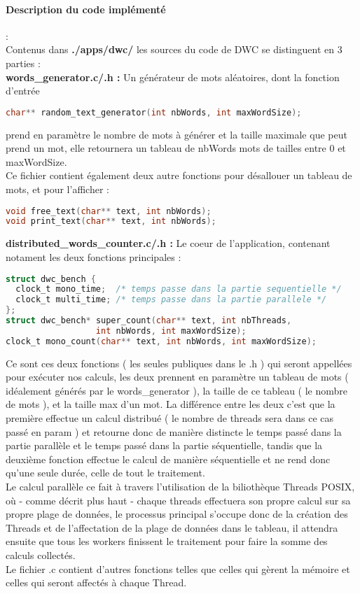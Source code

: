 \paragraph{Description du code implémenté}:\\

Contenus dans \textbf{./apps/dwc/} les sources du code de DWC se distinguent en 3 parties :\\

\textbf{words\_generator.c/.h :} Un générateur de mots aléatoires, dont la fonction d'entrée 
\begin{lstlisting}[language=C]
char** random_text_generator(int nbWords, int maxWordSize);
\end{lstlisting}
prend en paramètre le nombre de mots à générer et la taille maximale que peut prend un mot, elle retournera un tableau de nbWords mots de tailles entre 0 et maxWordSize.\\
Ce fichier contient également deux autre fonctions pour désallouer un tableau de mots, et pour l'afficher :
\begin{lstlisting}[language=C]
void free_text(char** text, int nbWords);
void print_text(char** text, int nbWords);
\end{lstlisting}

\textbf{distributed\_words\_counter.c/.h :} Le coeur de l'application, contenant notament les deux fonctions principales :
\begin{lstlisting}[language=C]
struct dwc_bench {
  clock_t mono_time;  /* temps passe dans la partie sequentielle */
  clock_t multi_time; /* temps passe dans la partie parallele */
};
struct dwc_bench* super_count(char** text, int nbThreads, 
			      int nbWords, int maxWordSize);
clock_t mono_count(char** text, int nbWords, int maxWordSize);
\end{lstlisting}
Ce sont ces deux fonctions ( les seules publiques dans le .h ) qui seront appellées pour exécuter nos calculs, les deux prennent en paramètre un tableau de mots ( idéalement générés par le words\_generator ), la taille de ce tableau ( le nombre de mots ), et la taille max d'un mot. La différence entre les deux c'est que la première effectue un calcul distribué ( le nombre de threads sera dans ce cas passé en param ) et retourne donc de manière distincte le temps passé dans la partie parallèle et le temps passé dans la partie séquentielle, tandis que la deuxième fonction effectue le calcul de manière séquentielle et ne rend donc qu'une seule durée, celle de tout le traitement.\\
Le calcul parallèle ce fait à travers l'utilisation de la biliothèque Threads POSIX, où - comme décrit plus haut - chaque threads effectuera son propre calcul sur sa propre plage de données, le processus principal s'occupe donc de la création des Threads et de l'affectation de la plage de données dans le tableau, il attendra ensuite que tous les workers finissent le traitement pour faire la somme des calculs collectés.\\
Le fichier .c contient d'autres fonctions telles que celles qui gèrent la mémoire et celles qui seront affectés à chaque Thread.

